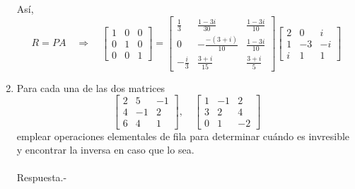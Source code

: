 \begin{enumerate}[\bfseries 1.]
	Así,
	$$
	R=PA \quad \Rightarrow \quad
	\left[
	    \begin{array}{rrr}
		1 & 0 & 0\\
		0 & 1 & 0\\
		0 & 0 & 1
	    \end{array}
	\right]
	=
	\left[
	    \begin{array}{rrr}
		    \frac{1}{3} & \frac{1-3i}{30} & \frac{1-3i}{10} \\
		    0 & -\frac{-(3+i)}{10} & \frac{1-3i}{10} \\
		    -\frac{i}{3} & \frac{3+i}{15} & \frac{3+i}{5}
	    \end{array}
	\right]
	\left[
	    \begin{array}{rrr}
	    2 & 0 & i\\
	    1 & -3 & -i\\
	    i & 1 & 1
	    \end{array}
	\right]
	$$
	\vspace{.5cm}

    \item Para cada una de las dos matrices
    $$
    \left[
	\begin{array}{rrr}
	    2 & 5 & -1\\
	    4 & -1 & 2\\
	    6 & 4 & 1
	\end{array} 
    \right],\quad
    \left[
	\begin{array}{rrr}
	    1 & -1 & 2\\
	    3 & 2 & 4\\
	    0 & 1 & -2
	\end{array}
    \right]
    $$
    emplear operaciones elementales de fila para determinar cuándo es invresible y encontrar la inversa en caso que lo sea.\\\\
	Respuesta.-\; 


\end{enumerate}

